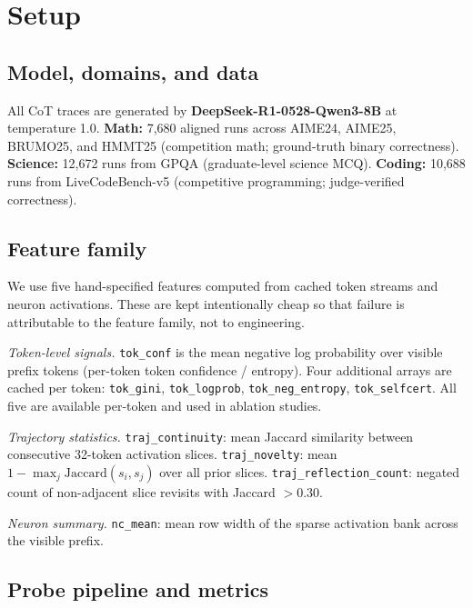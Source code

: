 \documentclass[10pt,twocolumn]{article}
\begin{document}
\section{Setup}
\label{sec:setup}

\subsection{Model, domains, and data}

All CoT traces are generated by \textbf{DeepSeek-R1-0528-Qwen3-8B} at temperature 1.0.
\textbf{Math:} 7,680 aligned runs across AIME24, AIME25, BRUMO25, and HMMT25 (competition math; ground-truth binary correctness).
\textbf{Science:} 12,672 runs from GPQA (graduate-level science MCQ).
\textbf{Coding:} 10,688 runs from LiveCodeBench-v5 (competitive programming; judge-verified correctness).

\subsection{Feature family}

We use five hand-specified features computed from cached token streams and neuron activations. These are kept intentionally cheap so that failure is attributable to the feature family, not to engineering.

\textit{Token-level signals.} \texttt{tok\_conf} is the mean negative log probability over visible prefix tokens (per-token token confidence / entropy). Four additional arrays are cached per token: \texttt{tok\_gini}, \texttt{tok\_logprob}, \texttt{tok\_neg\_entropy}, \texttt{tok\_selfcert}. All five are available per-token and used in ablation studies.

\textit{Trajectory statistics.} \texttt{traj\_continuity}: mean Jaccard similarity between consecutive 32-token activation slices. \texttt{traj\_novelty}: mean $1 - \max_j \text{Jaccard}(s_i, s_j)$ over all prior slices. \texttt{traj\_reflection\_count}: negated count of non-adjacent slice revisits with Jaccard $> 0.30$.

\textit{Neuron summary.} \texttt{nc\_mean}: mean row width of the sparse activation bank across the visible prefix.

\subsection{Probe pipeline and metrics}
\end{document}
